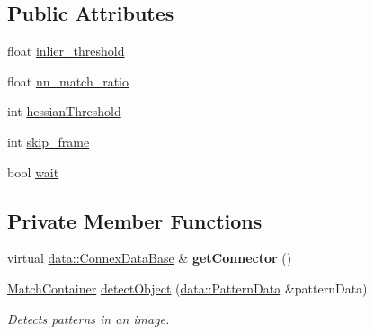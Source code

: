 \subsection*{Public Attributes}
\begin{DoxyCompactItemize}
\item 
float \hyperlink{classfilter_1_1algos_1_1_latch_aab05d5914e2196fc6847d42a6843a9e7}{inlier\+\_\+threshold}
\item 
float \hyperlink{classfilter_1_1algos_1_1_latch_a3cec94cb16dd56db4f06d29c904939c3}{nn\+\_\+match\+\_\+ratio}
\item 
int \hyperlink{classfilter_1_1algos_1_1_latch_a58701ffe3dbd2285af28c15fab09cf85}{hessian\+Threshold}
\item 
int \hyperlink{classfilter_1_1algos_1_1_latch_a41f85dfe09e4566d5a572682abdd7595}{skip\+\_\+frame}
\item 
bool \hyperlink{classfilter_1_1algos_1_1_latch_ad222b305aea19321304e329cf60aaf65}{wait}
\end{DoxyCompactItemize}
\subsection*{Private Member Functions}
\begin{DoxyCompactItemize}
\item 
\mbox{\label{classfilter_1_1algos_1_1_latch_adb5ec1549e961054b76f5b08a54915bb}} 
virtual \hyperlink{classfilter_1_1data_1_1_connex_data_base}{data\+::\+Connex\+Data\+Base} \& {\bfseries get\+Connector} ()
\item 
\hyperlink{classfilter_1_1algos_1_1_latch_1_1_match_container}{Match\+Container} \hyperlink{classfilter_1_1algos_1_1_latch_a7c01fdef12787d0b52abe4b0b023ac29}{detect\+Object} (\hyperlink{classfilter_1_1data_1_1_pattern_data}{data\+::\+Pattern\+Data} \&pattern\+Data)
\begin{DoxyCompactList}\small\item\em Detects patterns in an image. \end{DoxyCompactList}\end{DoxyCompactItemize}
